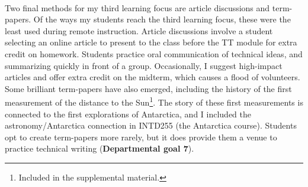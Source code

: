 \documentclass[../../../main.tex]{subfiles}
\begin{document}
\\
\vspace{0.25cm}
Two final methods for my third learning focus are article discussions and term-papers.  Of the ways my students reach the third learning focus, these were the least used during remote instruction.  Article discussions involve a student selecting an online article to present to the class before the TT module for extra credit on homework.  Students practice oral communication of technical ideas, and summarizing quickly in front of a group.  Occasionally, I suggest high-impact articles and offer extra credit on the midterm, which causes a flood of volunteers.  Some brilliant term-papers have also emerged, including the history of the first measurement of the distance to the Sun\footnote{Included in the supplemental material.}.  The story of these first measurements is connected to the first explorations of Antarctica, and I included the astronomy/Antarctica connection in INTD255 (the Antarctica course).  Students opt to create term-papers more rarely, but it does provide them a venue to practice technical writing (\textbf{Departmental goal 7}).
\end{document}
